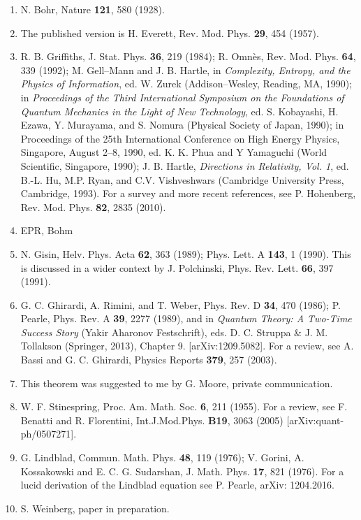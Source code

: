 \begin{enumerate}


\item N. Bohr, Nature {\bf 121}, 580 (1928).
\item The published version is H. Everett, Rev. Mod. Phys. {\bf 29}, 454 (1957).
 \item R. B. Griffiths, J. Stat. Phys. {\bf 36}, 219 (1984); R. Omn\`{e}s, Rev. Mod. Phys. {\bf 64}, 339 (1992); M. Gell--Mann and J. B. Hartle, in {\em Complexity, Entropy, and the Physics of Information}, ed. W. Zurek (Addison--Wesley, Reading, MA, 1990); in {\em Proceedings of the Third International Symposium on the Foundations of Quantum Mechanics in the Light of New Technology}, ed. S. Kobayashi, H. Ezawa, Y. Murayama, and S. Nomura (Physical Society of Japan, 1990); in {Proceedings of the 25th International Conference on High Energy Physics, Singapore, August 2--8, 1990}, ed. K. K. Phua and Y Yamaguchi (World Scientific, Singapore, 1990); J. B. Hartle, {\em Directions in Relativity, Vol. 1}, ed. B.-L. Hu, M.P. Ryan, and C.V. Vishveshwars (Cambridge University Press, Cambridge, 1993).  For a survey and more recent references, see P. Hohenberg, Rev. Mod. Phys. {\bf 82}, 2835 (2010).
 \item EPR, Bohm
\item N. Gisin, Helv. Phys. Acta {\bf 62}, 363 (1989); Phys. Lett. A {\bf 143}, 1 (1990).  This is discussed in a wider context by J. Polchinski, Phys. Rev. Lett. {\bf 66}, 397 (1991).
\item G. C. Ghirardi, A. Rimini,
and T. Weber, Phys. Rev. D {\bf 34}, 470 (1986);  P. Pearle, Phys. Rev. A {\bf 39}, 2277 (1989), and in {\em Quantum Theory: A Two-Time Success Story} (Yakir Aharonov Festschrift), eds. D. C. Struppa \& J. M. Tollakson (Springer, 2013), Chapter 9. [arXiv:1209.5082].  For a review, see A. Bassi and G. C. Ghirardi, Physics Reports {\bf 379}, 257 (2003).
\item This theorem was suggested to me by G. Moore, private communication.
\item W. F. Stinespring, Proc. Am. Math. Soc. {\bf 6}, 211 (1955).  For a review, see F. Benatti and R. Florentini,  Int.J.Mod.Phys. {\bf B19}, 3063 (2005) [arXiv:quant-ph/0507271].
\item G. Lindblad, Commun. Math. Phys. {\bf 48}, 119 (1976); V. Gorini, A. Kossakowski and E. C. G. Sudarshan, J. Math. Phys. {\bf 17}, 821 (1976).  For a lucid derivation of the Lindblad equation see P. Pearle, arXiv: 1204.2016.
\item S. Weinberg, paper in preparation.

\end{enumerate}
